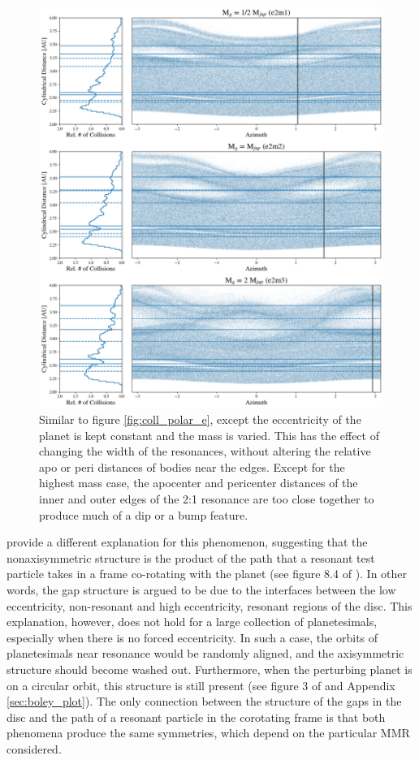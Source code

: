 \begin{figure}
    \includegraphics[width=\textwidth]{figures/grind/coll_polar_m.png}
    \caption{Similar to figure \ref{fig:coll_polar_e}, except the eccentricity of the planet is kept constant and the mass is varied.
    This has the effect of changing the width of the resonances, without altering the relative apo or peri distances of bodies near 
    the edges. Except for the highest mass case, the apocenter and pericenter distances of the inner and outer edges of the 2:1 
    resonance are too close together to produce much of a dip or a bump feature.\label{fig:coll_polar_m}}
\end{figure}

\cite{tabeshian16} provide a different explanation for this phenomenon, suggesting that the nonaxisymmetric structure is the 
product of the path that a resonant test particle takes in a frame co-rotating with the planet (see figure 8.4 of \cite{murray99}). In 
other words, the gap structure is argued to be due to the interfaces between the low eccentricity, non-resonant and high 
eccentricity, resonant regions of the disc. This explanation, however, does not hold for a large collection of planetesimals, 
especially when there is no forced eccentricity. In such a case, the orbits of planetesimals near resonance would be randomly 
aligned, and the axisymmetric structure should become washed out. Furthermore, when the perturbing planet is on a circular 
orbit, this structure is still present (see figure 3 of \cite{tabeshian16} and Appendix \ref{sec:boley_plot}). The only connection 
between the structure of the gaps in the disc and the path of a resonant particle in the corotating frame is that both phenomena 
produce the same symmetries, which depend on the particular MMR considered.

